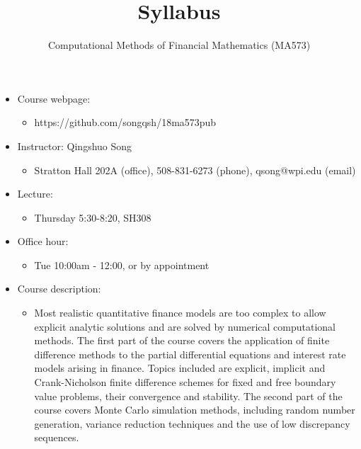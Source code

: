 \documentclass[11pt]{amsart}
\title{Syllabus}
\author{Computational Methods of Financial Mathematics (MA573)}
\begin{document}
\maketitle

\begin{itemize}
 
 \item Course webpage: 
\begin{itemize}
 \item  https://github.com/songqsh/18ma573pub
\end{itemize}

 \item Instructor: Qingshuo Song 
\begin{itemize}
 \item  Stratton Hall 202A (office),  508-831-6273 (phone), qsong@wpi.edu (email)
\end{itemize}
\item Lecture:
\begin{itemize}
 \item Thursday 5:30-8:20,  SH308
\end{itemize}

 \item Office hour: 
\begin{itemize}
 \item Tue 10:00am - 12:00, or by appointment
\end{itemize}

\item Course description:
\begin{itemize}
 \item Most realistic quantitative finance models are too complex to allow explicit analytic solutions and are solved by numerical computational methods. The first part of the course covers the application of finite difference methods to the partial differential equations and interest rate models arising in finance. Topics included are explicit, implicit and Crank-Nicholson finite difference schemes for fixed and free boundary value problems, their convergence and stability. The second part of the course covers Monte Carlo simulation methods, including random number generation, variance reduction techniques and the use of low discrepancy sequences. 
\end{itemize}


\end{itemize}
\end{document}
